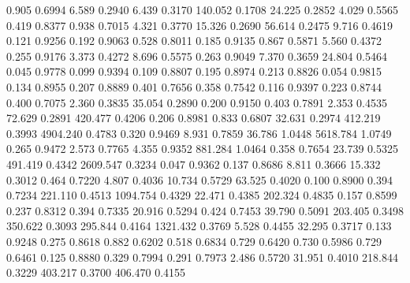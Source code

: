 0.905    0.6994 %
6.589    0.2940 %
6.439    0.3170 %
140.052  0.1708 %
24.225   0.2852 %
4.029    0.5565 %
0.419    0.8377 %
0.938    0.7015 %
4.321    0.3770 %
15.326   0.2690 %
56.614   0.2475 %
9.716    0.4619 %
0.121    0.9256 %
0.192    0.9063 %
0.528    0.8011 %
0.185    0.9135 %
0.867    0.5871 %
5.560    0.4372 %
0.255    0.9176 %
3.373    0.4272 %
8.696    0.5575 %
0.263    0.9049 %
7.370    0.3659 %
24.804   0.5464 %
0.045    0.9778 %
0.099    0.9394 %
0.109    0.8807 %
0.195    0.8974 %
0.213    0.8826 %
0.054    0.9815 %
0.134    0.8955 %
0.207    0.8889 %
0.401    0.7656 %
0.358    0.7542 %
0.116    0.9397 %
0.223    0.8744 %
0.400    0.7075 %
2.360    0.3835 %
35.054   0.2890 %
0.200    0.9150 %
0.403    0.7891 %
2.353    0.4535 %
72.629   0.2891 %
420.477  0.4206 %
0.206    0.8981 %
0.833    0.6807 %
32.631   0.2974 %
412.219  0.3993 %
4904.240 0.4783 %
0.320    0.9469 %
8.931    0.7859 %
36.786   1.0448 %
5618.784 1.0749 %
0.265    0.9472 %
2.573    0.7765 %
4.355    0.9352 %
881.284  1.0464 %
0.358    0.7654 %
23.739   0.5325 %
491.419  0.4342 %
2609.547 0.3234 %
0.047    0.9362 %
0.137    0.8686 %
8.811    0.3666 %
15.332   0.3012 %
0.464    0.7220 %
4.807    0.4036 %
10.734   0.5729 %
63.525   0.4020 %
0.100    0.8900 %
0.394    0.7234 %
221.110  0.4513 %
1094.754 0.4329 %
22.471   0.4385 %
202.324  0.4835 %
0.157    0.8599 %
0.237    0.8312 %
0.394    0.7335 %
20.916   0.5294 %
0.424    0.7453 %
39.790   0.5091 %
203.405  0.3498 %
350.622  0.3093 %
295.844  0.4164 %
1321.432 0.3769 %
5.528    0.4455 %
32.295   0.3717 %
0.133   0.9248 %
0.275   0.8618 %
0.882   0.6202 %
0.518   0.6834 %
0.729   0.6420 %
0.730   0.5986 %
0.729   0.6461 %
0.125   0.8880 %
0.329   0.7994 %
0.291   0.7973 %
2.486   0.5720 %
31.951  0.4010 %
218.844 0.3229 %
403.217 0.3700 %
406.470 0.4155 %
